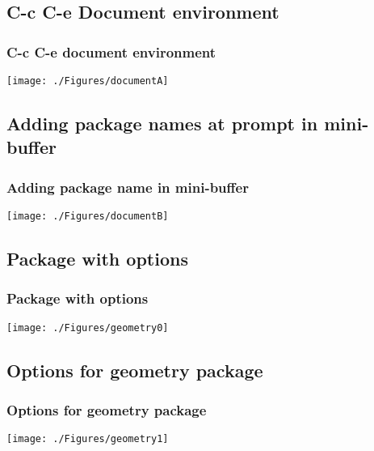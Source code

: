 \documentclass{beamer}
\begin{document}
\subsection{C-c C-e Document environment}
\begin{frame}
\frametitle{C-c C-e document environment}
\begin{center}
\begin{center}
    \texttt{[image: ./Figures/documentA]}
\end{center}

\end{center}
\end{frame}


\subsection{Adding package names at prompt in mini-buffer}
\begin{frame}
\frametitle{Adding package name in mini-buffer}
\begin{center}
\begin{center}
    \texttt{[image: ./Figures/documentB]}
\end{center}
\end{center}
\end{frame}


\subsection{Package with options}
\begin{frame}
\frametitle{Package with options}
\begin{center}
\begin{center}
    \texttt{[image: ./Figures/geometry0]}
\end{center}
\end{center}
\end{frame}


\subsection{Options for geometry package}
\begin{frame}
\frametitle{Options for geometry package}
\begin{center}
\begin{center}
    \texttt{[image: ./Figures/geometry1]}
\end{center}
\end{center}
\end{frame}
\end{document}
